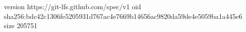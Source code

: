 version https://git-lfs.github.com/spec/v1
oid sha256:bdc42c1306fe5205931d767ac4e7669b14656ac9820da59de4e5059ba1a445e6
size 205751
